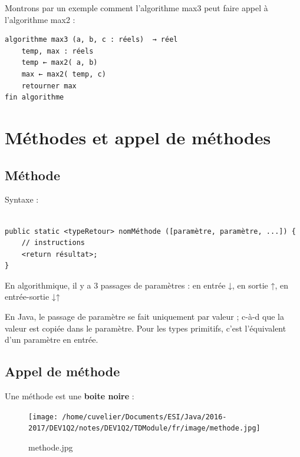 \documentclass[11pt,a4paper]{article}
\begin{document}
            \par
        Montrons par un exemple comment l'algorithme max3 peut faire appel \`a l'algorithme max2 : 
            \par
        \begin{verbatim}
algorithme max3 (a, b, c : réels)  → réel
    temp, max : réels
    temp ← max2( a, b)
    max ← max2( temp, c)
    retourner max
fin algorithme
      \end{verbatim}\section{M\'ethodes et appel de m\'ethodes}\subsection{M\'ethode}
		  Syntaxe : 
		  \begin{verbatim}

public static <typeRetour> nomMéthode ([paramètre, paramètre, ...]) {
    // instructions
    <return résultat>;
}				\end{verbatim}
        En algorithmique, il y a 3 passages de param\`etres :
        en entr\'ee ↓, en sortie ↑, en entr\'ee-sortie ↓↑
      
            \par
        
        En Java, le passage de param\`etre se fait uniquement par valeur ; 
        c-\`a-d que la valeur est copi\'ee dans le param\`etre.
        Pour les types primitifs, c'est l'\'equivalent d'un param\`etre en entr\'ee.
      
            \par
        \subsection{Appel de m\'ethode}
		    Une m\'ethode est une \textbf{boite noire} : 
		  
            \par
        \begin{figure}[hbt]
				    \begin{center}
					\texttt{[image: /home/cuvelier/Documents/ESI/Java/2016-2017/DEV1Q2/notes/DEV1Q2/TDModule/fr/image/methode.jpg]}
						\end{center}
                
                    \caption[methode.jpg]{methode.jpg}
                \end{figure}
                    
\end{document}
